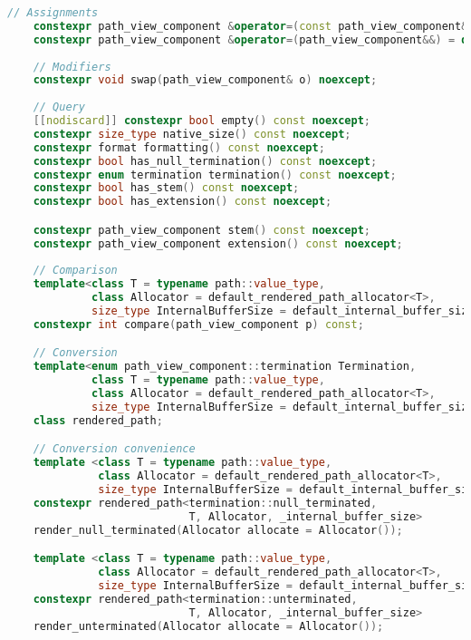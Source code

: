 \documentclass[11pt]{article}
\begin{document}
\begin{lstlisting}[language=cpp]
    // Assignments
    constexpr path_view_component &operator=(const path_view_component&) = default;
    constexpr path_view_component &operator=(path_view_component&&) = default;
    
    // Modifiers
    constexpr void swap(path_view_component& o) noexcept;
    
    // Query
    [[nodiscard]] constexpr bool empty() const noexcept;
    constexpr size_type native_size() const noexcept;
    constexpr format formatting() const noexcept;
    constexpr bool has_null_termination() const noexcept;
    constexpr enum termination termination() const noexcept;
    constexpr bool has_stem() const noexcept;
    constexpr bool has_extension() const noexcept;

    constexpr path_view_component stem() const noexcept;
    constexpr path_view_component extension() const noexcept;
    
    // Comparison
    template<class T = typename path::value_type,
             class Allocator = default_rendered_path_allocator<T>,
             size_type InternalBufferSize = default_internal_buffer_size>
    constexpr int compare(path_view_component p) const;

    // Conversion
    template<enum path_view_component::termination Termination,
             class T = typename path::value_type,
             class Allocator = default_rendered_path_allocator<T>,
             size_type InternalBufferSize = default_internal_buffer_size>
    class rendered_path;

    // Conversion convenience
    template <class T = typename path::value_type,
              class Allocator = default_rendered_path_allocator<T>,
              size_type InternalBufferSize = default_internal_buffer_size>
    constexpr rendered_path<termination::null_terminated,
                            T, Allocator, _internal_buffer_size>
    render_null_terminated(Allocator allocate = Allocator());

    template <class T = typename path::value_type,
              class Allocator = default_rendered_path_allocator<T>,
              size_type InternalBufferSize = default_internal_buffer_size>
    constexpr rendered_path<termination::unterminated,
                            T, Allocator, _internal_buffer_size>
    render_unterminated(Allocator allocate = Allocator());



\end{lstlisting}
\end{document}
